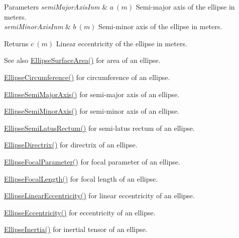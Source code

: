 \begin{DoxyParams}{Parameters}
{\em semi\+Major\+Axis\+Inm} & $ a\ (m)$ Semi-\/major axis of the ellipse in meters. \\
\hline
{\em semi\+Minor\+Axis\+Inm} & $ b\ (m)$ Semi-\/minor axis of the ellipse in meters. \\
\hline
\end{DoxyParams}
\begin{DoxyReturn}{Returns}
$ c\ (m)$ Linear eccentricity of the ellipse in meters. 
\end{DoxyReturn}
\begin{DoxySeeAlso}{See also}
\mbox{\hyperlink{group___e_g_x_math-_geometry-2_d-_ellipse-_surface_area_ga4ce8c8323e9718ce5458f4ab7f6d823d}{Ellipse\+Surface\+Area()}} for area of an ellipse. 

\mbox{\hyperlink{group___e_g_x_math-_geometry-2_d-_ellipse-_circumference_ga4172802ac674eb53467b44928ac635c7}{Ellipse\+Circumference()}} for circumference of an ellipse. 

\mbox{\hyperlink{group___e_g_x_math-_geometry-2_d-_ellipse-_semi_major_axis_ga646a2ca065f4ac3f666a9ea22f3bb527}{Ellipse\+Semi\+Major\+Axis()}} for semi-\/major axis of an ellipse. 

\mbox{\hyperlink{group___e_g_x_math-_geometry-2_d-_ellipse-_semi_minor_axis_gae461acf3333565d69527dd86e9aa2b32}{Ellipse\+Semi\+Minor\+Axis()}} for semi-\/minor axis of an ellipse. 

\mbox{\hyperlink{group___e_g_x_math-_geometry-2_d-_ellipse-_semi_latus_rectum_gacfd1844eb4ef3d1ee3c0b460a6442ae6}{Ellipse\+Semi\+Latus\+Rectum()}} for semi-\/latus rectum of an ellipse. 

\mbox{\hyperlink{group___e_g_x_math-_geometry-2_d-_ellipse-_directrix_gace8f72a8efbc9c18d3eb689151405106}{Ellipse\+Directrix()}} for directrix of an ellipse. 

\mbox{\hyperlink{group___e_g_x_math-_geometry-2_d-_ellipse-_focal_parameter_ga4cd01a38c72c092ef9791351948bf69b}{Ellipse\+Focal\+Parameter()}} for focal parameter of an ellipse. 

\mbox{\hyperlink{group___e_g_x_math-_geometry-2_d-_ellipse-_focal_length_gab8d63de7640c880cfecaeada6f2afdac}{Ellipse\+Focal\+Length()}} for focal length of an ellipse. 

\mbox{\hyperlink{group___e_g_x_math-_geometry-2_d-_ellipse-_linear_eccentricity_gac70b3010e30aa8b73deb50fe2b9b9a91}{Ellipse\+Linear\+Eccentricity()}} for linear eccentricity of an ellipse. 

\mbox{\hyperlink{group___e_g_x_math-_geometry-2_d-_ellipse-_eccentricity_ga6a0a7fba17f782616894cfc447628c33}{Ellipse\+Eccentricity()}} for eccentricity of an ellipse. 

\mbox{\hyperlink{group___e_g_x_math-_geometry-2_d-_ellipse-_inertia_ga10a3049c2f04b50f271fb01dc62e4cf8}{Ellipse\+Inertia()}} for inertial tensor of an ellipse. 
\end{DoxySeeAlso}
